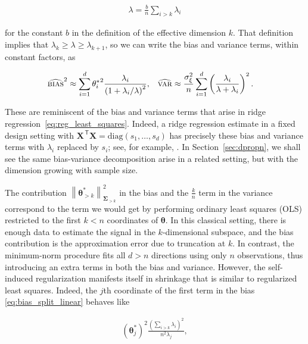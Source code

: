 \begin{align}
    \lambda = \frac{b}{n}\sum_{i>k}\lambda_i
  \end{align}

for the constant $b$ in the definition of the effective dimension $k$.  That definition implies that $\lambda_k\ge \lambda\ge
\lambda_{k+1}$, so we can write the bias and variance terms, within constant factors, as

\begin{align*}
    {\widehat{\textsc{bias}}^2} & \approx \sum_{i=1}^d
      {\theta^*_i}^2
      \frac{\lambda_i}{\left(1+\lambda_i/\lambda\right)^2}, &
    {\widehat{\textsc{var}}} & \approx \frac{\sigma_\xi^2}{n}\sum_{i=1}^d
      \left(\frac{\lambda_i}{\lambda+\lambda_i}\right)^2.
  \end{align*}

These are reminiscent of the bias and variance terms that arise in ridge regression~\eqref{eq:reg_least_squares}. Indeed, a ridge regression estimate in a fixed design setting with
${\boldsymbol X}^\ensuremath{{\scriptscriptstyle\mathsf{\,T}}}{\boldsymbol X}=\text{diag}(s_1,\ldots,s_d)$ has precisely these bias and variance terms with $\lambda_i$ replaced by $s_i$; see, for example,
\cite[Lemma~1]{JMLR:v14:dhillon13a}. In Section~\ref{sec:dpropn},
we shall see the same bias-variance decomposition arise in a related setting, but with the dimension growing with sample size.

\iffalse
The contribution  $\left\|{\boldsymbol \theta}^*_{>k}\right\|^2_{{\boldsymbol \Sigma}_{>k}}$ in the bias and the $\frac{k}{n}$ term in the variance correspond to the term we would get by performing ordinary least squares (OLS) restricted to the first $k<n$ coordinates of ${\boldsymbol \theta}$. In this classical setting, there is enough data to estimate the signal in the $k$-dimensional subspace, and the bias contribution is the approximation error due to truncation at $k$. In contrast, the minimum-norm procedure fits all $d>n$ directions using only $n$ observations, thus introducing an extra terms in both the bias and variance. However, the self-induced regularization manifests itself in shrinkage that is similar to regularized least squares. Indeed, the $j$th coordinate of the first term in the bias
\eqref{eq:bias_split_linear} behaves like

\begin{align}
	  \label{eq:coeff_minnorm_linear_bias}
    ({\boldsymbol \theta}_j^*)^2 \frac{\left(\sum_{i>k}\lambda_i\right)^2}{n^2\lambda_j},
  \end{align}

